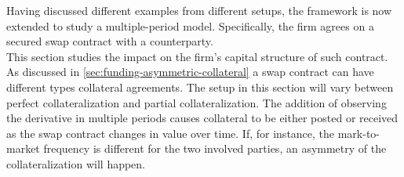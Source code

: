 \documentclass[main.tex]{subfiles}
\begin{document}
    Having discussed different examples from different setups,
    the framework is now extended to study a multiple-period model.
    Specifically, the firm agrees on a secured swap contract with a counterparty.
    \\
    This section studies the impact on the firm's capital structure of such contract.
    As discussed in \cref{sec:funding-asymmetric-collateral} a swap contract can have different types collateral agreements.
    The setup in this section will vary between perfect collateralization and partial collateralization.
    The addition of observing the derivative in multiple periods causes collateral to be either posted or received as the swap contract changes in value over time.
    If, for instance, the mark-to-market frequency is different for the two involved parties, an asymmetry of the collateralization will happen.

\end{document}
